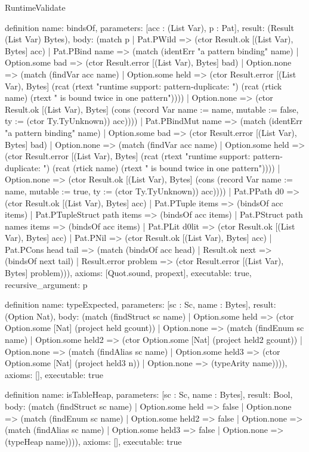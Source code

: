 \begin{lexlean}{RuntimeValidate}
\begin{semanticmodule}
definition{
  name: bindsOf,
  parameters: [acc : (List Var), p : Pat],
  result: (Result (List Var) Bytes),
  body: (match p
    | Pat.PWild => (ctor Result.ok [(List Var), Bytes] acc)
    | Pat.PBind name => (match (identErr "a pattern binding" name)
      | Option.some bad => (ctor Result.error [(List Var), Bytes] bad)
      | Option.none => (match (findVar acc name)
        | Option.some held => (ctor Result.error [(List Var), Bytes] (rcat (rtext "runtime support: pattern-duplicate: ") (rcat (rtick name) (rtext " is bound twice in one pattern"))))
        | Option.none => (ctor Result.ok [(List Var), Bytes] (cons (record Var {name := name, mutable := false, ty := (ctor Ty.TyUnknown)}) acc))))
    | Pat.PBindMut name => (match (identErr "a pattern binding" name)
      | Option.some bad => (ctor Result.error [(List Var), Bytes] bad)
      | Option.none => (match (findVar acc name)
        | Option.some held => (ctor Result.error [(List Var), Bytes] (rcat (rtext "runtime support: pattern-duplicate: ") (rcat (rtick name) (rtext " is bound twice in one pattern"))))
        | Option.none => (ctor Result.ok [(List Var), Bytes] (cons (record Var {name := name, mutable := true, ty := (ctor Ty.TyUnknown)}) acc))))
    | Pat.PPath d0 => (ctor Result.ok [(List Var), Bytes] acc)
    | Pat.PTuple items => (bindsOf acc items)
    | Pat.PTupleStruct path items => (bindsOf acc items)
    | Pat.PStruct path names items => (bindsOf acc items)
    | Pat.PLit d0lit => (ctor Result.ok [(List Var), Bytes] acc)
    | Pat.PNil => (ctor Result.ok [(List Var), Bytes] acc)
    | Pat.PCons head tail => (match (bindsOf acc head)
      | Result.ok next => (bindsOf next tail)
      | Result.error problem => (ctor Result.error [(List Var), Bytes] problem))),
  axioms: [Quot.sound, propext],
  executable: true,
  recursive_argument: p
}

definition{
  name: typeExpected,
  parameters: [sc : Sc, name : Bytes],
  result: (Option Nat),
  body: (match (findStruct sc name)
    | Option.some held => (ctor Option.some [Nat] (project held gcount))
    | Option.none => (match (findEnum sc name)
      | Option.some held2 => (ctor Option.some [Nat] (project held2 gcount))
      | Option.none => (match (findAlias sc name)
        | Option.some held3 => (ctor Option.some [Nat] (project held3 n))
        | Option.none => (typeArity name)))),
  axioms: [],
  executable: true
}

definition{
  name: isTableHeap,
  parameters: [sc : Sc, name : Bytes],
  result: Bool,
  body: (match (findStruct sc name)
    | Option.some held => false
    | Option.none => (match (findEnum sc name)
      | Option.some held2 => false
      | Option.none => (match (findAlias sc name)
        | Option.some held3 => false
        | Option.none => (typeHeap name)))),
  axioms: [],
  executable: true
}


\end{semanticmodule}
\end{lexlean}
